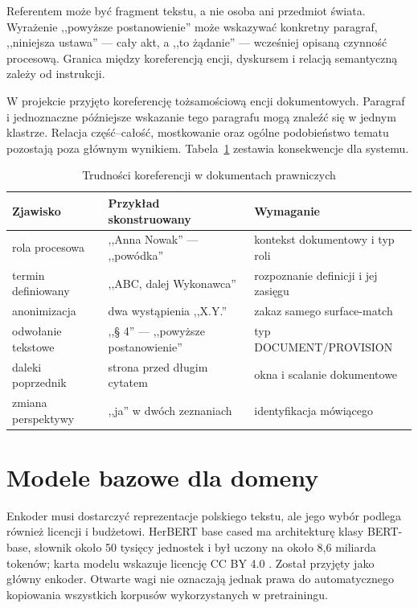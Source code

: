 Referentem może być fragment tekstu, a nie osoba ani przedmiot świata. Wyrażenie ,,powyższe postanowienie'' może wskazywać konkretny paragraf, ,,niniejsza ustawa'' --- cały akt, a ,,to żądanie'' --- wcześniej opisaną czynność procesową. Granica między koreferencją encji, dyskursem i relacją semantyczną zależy od instrukcji.

W projekcie przyjęto koreferencję tożsamościową encji dokumentowych. Paragraf i jednoznaczne późniejsze wskazanie tego paragrafu mogą znaleźć się w jednym klastrze. Relacja część--całość, mostkowanie oraz ogólne podobieństwo tematu pozostają poza głównym wynikiem. Tabela~\ref{tab:trudnosci-prawo} zestawia konsekwencje dla systemu.

\begin{table}[htbp]
  \centering
  \caption{Trudności koreferencji w dokumentach prawniczych}
  \label{tab:trudnosci-prawo}
  \begin{tabular}{p{}p{}p{}}
    \toprule
    Zjawisko & Przykład skonstruowany & Wymaganie \\
    \midrule
    rola procesowa & ,,Anna Nowak'' --- ,,powódka'' & kontekst dokumentowy i typ roli \\
    termin definiowany & ,,ABC, dalej Wykonawca'' & rozpoznanie definicji i jej zasięgu \\
    anonimizacja & dwa wystąpienia ,,X.Y.'' & zakaz samego surface-match \\
    odwołanie tekstowe & ,,§ 4'' --- ,,powyższe postanowienie'' & typ DOCUMENT/PROVISION \\
    daleki poprzednik & strona przed długim cytatem & okna i scalanie dokumentowe \\
    zmiana perspektywy & ,,ja'' w dwóch zeznaniach & identyfikacja mówiącego \\
    \bottomrule
  \end{tabular}
\end{table}

\section{Modele bazowe dla domeny}
\label{sec:modele-bazowe-prawo}

Enkoder musi dostarczyć reprezentacje polskiego tekstu, ale jego wybór podlega również licencji i budżetowi. HerBERT base cased ma architekturę klasy BERT-base, słownik około 50 tysięcy jednostek i był uczony na około 8,6 miliarda tokenów; karta modelu wskazuje licencję CC BY 4.0 \cite{mroczkowski_2021_herbert,allegro_2026_herbert}. Został przyjęty jako główny enkoder. Otwarte wagi nie oznaczają jednak prawa do automatycznego kopiowania wszystkich korpusów wykorzystanych w pretrainingu.

